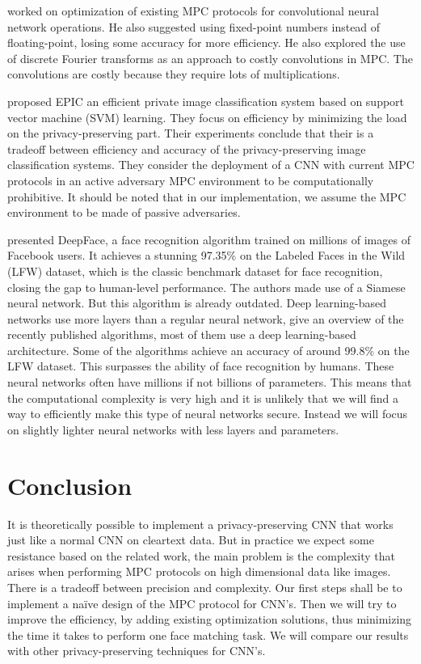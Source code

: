 \cite{campmans2018optimizing} worked on optimization of existing MPC protocols for convolutional neural network operations. He also suggested using fixed-point numbers instead of floating-point, losing some accuracy for more efficiency. He also explored the use of discrete Fourier transforms as an approach to costly convolutions in MPC. The convolutions are costly because they require lots of multiplications.

\cite{makri2019epic} proposed EPIC an efficient private image classification system based on support vector machine (SVM) learning. They focus on efficiency by minimizing the load on the privacy-preserving part. Their experiments conclude that their is a tradeoff between efficiency and accuracy of the privacy-preserving image classification systems. They consider the deployment of a CNN with current MPC protocols in an active adversary MPC environment to be computationally prohibitive. It should be noted that in our implementation, we assume the MPC environment to be made of passive adversaries.

\cite{taigman2014deepface} presented DeepFace, a face recognition algorithm trained on millions of images of Facebook users. It achieves a stunning 97.35\% on the Labeled Faces in the Wild (LFW) dataset, which is the classic benchmark dataset for face recognition, closing the gap to human-level performance. The authors made use of a Siamese neural network. But this algorithm is already outdated. Deep learning-based networks use more layers than a regular neural network, \cite{wang2018deep} give an overview of the recently published algorithms, most of them use a deep learning-based architecture. Some of the algorithms achieve an accuracy of around 99.8\% on the LFW dataset. This surpasses the ability of face recognition by humans. These neural networks often have millions if not billions of parameters. This means that the computational complexity is very high and it is unlikely that we will find a way to efficiently make this type of neural networks secure. Instead we will focus on slightly lighter neural networks with less layers and parameters.

\section{Conclusion}
It is theoretically possible to implement a privacy-preserving CNN that works just like a normal CNN on cleartext data. But in practice we expect some resistance based on the related work, the main problem is the complexity that arises when performing MPC protocols on high dimensional data like images. There is a tradeoff between precision and complexity. Our first steps shall be to implement a na\"ive design of the MPC protocol for CNN's. Then we will try to improve the efficiency, by adding existing optimization solutions, thus minimizing the time it takes to perform one face matching task. We will compare our results with other privacy-preserving techniques for CNN's.
